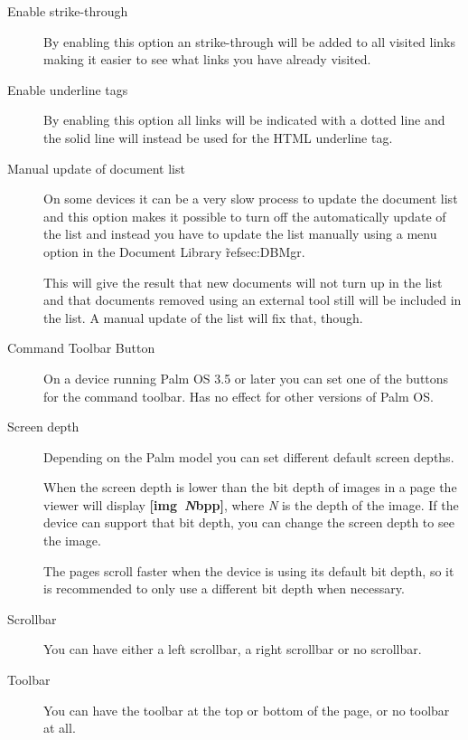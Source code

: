 \begin{description}
  \item[Enable strike-through] By enabling this option an strike-through 
  will be added to all visited links making it easier to see what links 
  you have already visited.

  \item[Enable underline tags] By enabling this option all links will
  be indicated with a dotted line and the solid line will instead be
  used for the HTML underline tag. 

  \item[Manual update of document list] On some devices it can be a very slow
  process to update the document list and this option makes it possible to
  turn off the automatically update of the list and instead you have to update
  the list manually using a menu option in the Document Library \~ref{sec:DBMgr}.

  \note{} This will give the result that new documents will not turn up in
  the list and that documents removed using an external tool still will be
  included in the list. A manual update of the list will fix that, though.

  \item[Command Toolbar Button] On a device running Palm OS 3.5 or later
  you can set one of the buttons for the command toolbar. Has no effect 
  for other versions of Palm OS.

  \item[Screen depth] Depending on the Palm model you can set different
  default screen depths.

  When the screen depth is lower than the bit depth of images in a page 
  the viewer will display \mbox{\textbf{[img \emph{N}bpp]}}, where \emph{N}
  is the depth of the image. If the device can support that bit depth, 
  you can change the screen depth to see the image.

  \hint{} The pages scroll faster when the device is using its default 
  bit depth, so it is recommended to only use a different bit depth when 
  necessary.

  \item[Scrollbar] You can have either a left scrollbar, a right scrollbar 
  or no scrollbar.

  \item[Toolbar] You can have the toolbar at the top or bottom of the page,
  or no toolbar at all.

\end{description}

